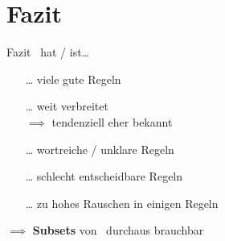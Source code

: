 \documentclass{beamer}
\begin{document}
    \section{Fazit}

    \label{sec:fazit}
    \begin{frame}{Fazit}
        \misra\ hat / ist\ldots
        \begin{itemize}
            \item[\ldots] viele gute Regeln
            \item[\ldots] weit verbreitet\\
                $\implies$ tendenziell eher bekannt
            \item[\ldots] wortreiche / unklare Regeln
            \item[\ldots] schlecht entscheidbare Regeln
            \item[\ldots] zu hohes Rauschen in einigen Regeln
        \end{itemize}
        \vspace{0.3cm}
        \pause
        $\implies$ \textbf{Subsets} von \misra\ durchaus brauchbar
    \end{frame}
\end{document}

